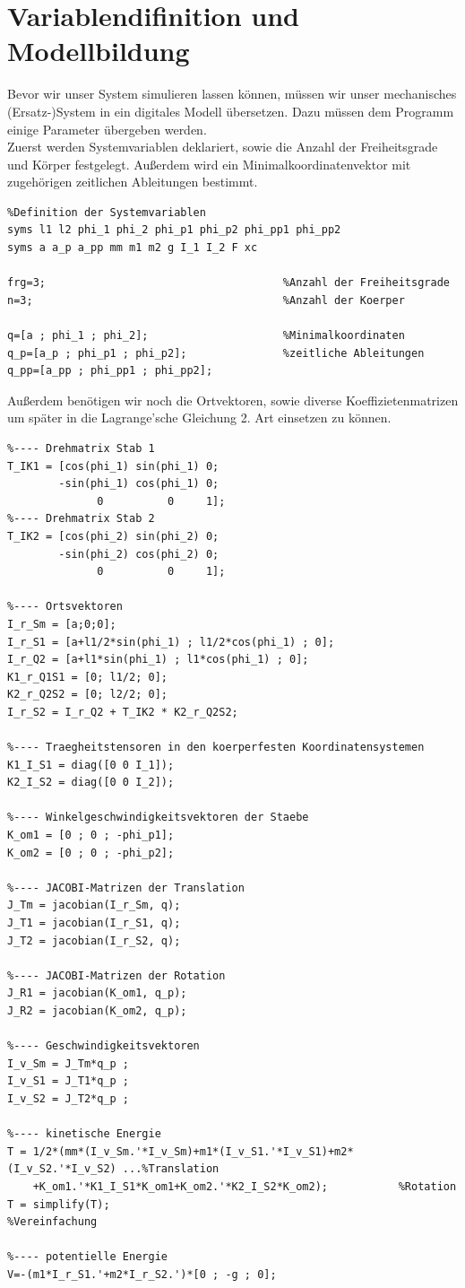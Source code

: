 \documentclass[a4paper, 10pt]{report}
\begin{document}
 \section{Variablendifinition und Modellbildung}
Bevor wir unser System simulieren lassen können, müssen wir unser mechanisches (Ersatz-)System in ein digitales Modell übersetzen. Dazu müssen dem Programm einige Parameter übergeben werden.\\
Zuerst werden Systemvariablen deklariert, sowie die Anzahl der Freiheitsgrade und Körper festgelegt. Außerdem wird ein Minimalkoordinatenvektor mit zugehörigen zeitlichen Ableitungen bestimmt.
\begin{lstlisting}
%Definition der Systemvariablen
syms l1 l2 phi_1 phi_2 phi_p1 phi_p2 phi_pp1 phi_pp2
syms a a_p a_pp mm m1 m2 g I_1 I_2 F xc

frg=3;                                     %Anzahl der Freiheitsgrade
n=3;                                       %Anzahl der Koerper

q=[a ; phi_1 ; phi_2];                     %Minimalkoordinaten
q_p=[a_p ; phi_p1 ; phi_p2];               %zeitliche Ableitungen
q_pp=[a_pp ; phi_pp1 ; phi_pp2];
\end{lstlisting}
\newpage \noindent
Außerdem benötigen wir noch die Ortvektoren, sowie diverse Koeffizietenmatrizen um später in die Lagrange'sche Gleichung 2. Art einsetzen zu können. 
\begin{lstlisting}
%---- Drehmatrix Stab 1
T_IK1 = [cos(phi_1) sin(phi_1) 0;
        -sin(phi_1) cos(phi_1) 0;
              0          0     1];
%---- Drehmatrix Stab 2
T_IK2 = [cos(phi_2) sin(phi_2) 0;
        -sin(phi_2) cos(phi_2) 0;
              0          0     1];

%---- Ortsvektoren
I_r_Sm = [a;0;0];
I_r_S1 = [a+l1/2*sin(phi_1) ; l1/2*cos(phi_1) ; 0];
I_r_Q2 = [a+l1*sin(phi_1) ; l1*cos(phi_1) ; 0];
K1_r_Q1S1 = [0; l1/2; 0];
K2_r_Q2S2 = [0; l2/2; 0];
I_r_S2 = I_r_Q2 + T_IK2 * K2_r_Q2S2;

%---- Traegheitstensoren in den koerperfesten Koordinatensystemen
K1_I_S1 = diag([0 0 I_1]);
K2_I_S2 = diag([0 0 I_2]);

%---- Winkelgeschwindigkeitsvektoren der Staebe
K_om1 = [0 ; 0 ; -phi_p1];
K_om2 = [0 ; 0 ; -phi_p2];

%---- JACOBI-Matrizen der Translation
J_Tm = jacobian(I_r_Sm, q);
J_T1 = jacobian(I_r_S1, q);
J_T2 = jacobian(I_r_S2, q);

%---- JACOBI-Matrizen der Rotation
J_R1 = jacobian(K_om1, q_p);
J_R2 = jacobian(K_om2, q_p);

%---- Geschwindigkeitsvektoren
I_v_Sm = J_Tm*q_p ;
I_v_S1 = J_T1*q_p ; 
I_v_S2 = J_T2*q_p ;

%---- kinetische Energie
T = 1/2*(mm*(I_v_Sm.'*I_v_Sm)+m1*(I_v_S1.'*I_v_S1)+m2*(I_v_S2.'*I_v_S2) ...%Translation
    +K_om1.'*K1_I_S1*K_om1+K_om2.'*K2_I_S2*K_om2);           %Rotation
T = simplify(T);                                             %Vereinfachung

%---- potentielle Energie
V=-(m1*I_r_S1.'+m2*I_r_S2.')*[0 ; -g ; 0];
\end{lstlisting}
\end{document}
